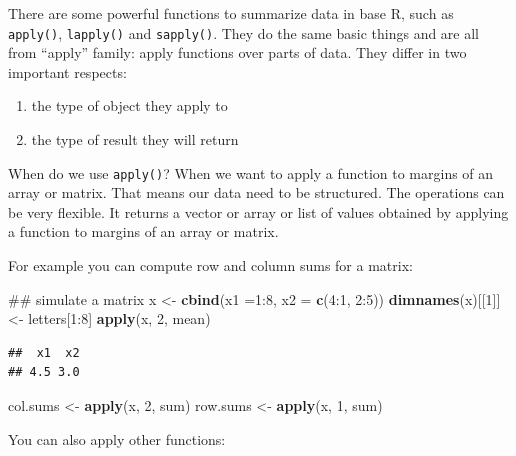 \documentclass[12pt,]{krantz}
\newenvironment{Shaded}{\begin{snugshade}}{\end{snugshade}}
\newcommand{\KeywordTok}[1]{\textcolor[rgb]{0.13,0.29,0.53}{\textbf{{#1}}}}
\newcommand{\DataTypeTok}[1]{\textcolor[rgb]{0.13,0.29,0.53}{{#1}}}
\newcommand{\DecValTok}[1]{\textcolor[rgb]{0.00,0.00,0.81}{{#1}}}
\newcommand{\StringTok}[1]{\textcolor[rgb]{0.31,0.60,0.02}{{#1}}}
\newcommand{\NormalTok}[1]{{#1}}
\providecommand{\tightlist}{%
  \setlength{\itemsep}{0pt}\setlength{\parskip}{0pt}}
\theoremstyle{definition}
\theoremstyle{definition}
\theoremstyle{remark}
\begin{document}
There are some powerful functions to summarize data in base R, such as
\texttt{apply()}, \texttt{lapply()} and \texttt{sapply()}. They do the
same basic things and are all from ``apply'' family: apply functions
over parts of data. They differ in two important respects:

\begin{enumerate}
\def\labelenumi{\arabic{enumi}.}
\tightlist
\item
  the type of object they apply to
\item
  the type of result they will return
\end{enumerate}

When do we use \texttt{apply()}? When we want to apply a function to
margins of an array or matrix. That means our data need to be
structured. The operations can be very flexible. It returns a vector or
array or list of values obtained by applying a function to margins of an
array or matrix.

For example you can compute row and column sums for a matrix:

\begin{Shaded}
\begin{Highlighting}[]
\NormalTok{## simulate a matrix}
\NormalTok{x <-}\StringTok{ }\KeywordTok{cbind}\NormalTok{(}\DataTypeTok{x1 =}\DecValTok{1}\NormalTok{:}\DecValTok{8}\NormalTok{, }\DataTypeTok{x2 =} \KeywordTok{c}\NormalTok{(}\DecValTok{4}\NormalTok{:}\DecValTok{1}\NormalTok{, }\DecValTok{2}\NormalTok{:}\DecValTok{5}\NormalTok{))}
\KeywordTok{dimnames}\NormalTok{(x)[[}\DecValTok{1}\NormalTok{]] <-}\StringTok{ }\NormalTok{letters[}\DecValTok{1}\NormalTok{:}\DecValTok{8}\NormalTok{]}
\KeywordTok{apply}\NormalTok{(x, }\DecValTok{2}\NormalTok{, mean)}
\end{Highlighting}
\end{Shaded}

\begin{verbatim}
##  x1  x2 
## 4.5 3.0
\end{verbatim}

\begin{Shaded}
\begin{Highlighting}[]
\NormalTok{col.sums <-}\StringTok{ }\KeywordTok{apply}\NormalTok{(x, }\DecValTok{2}\NormalTok{, sum)}
\NormalTok{row.sums <-}\StringTok{ }\KeywordTok{apply}\NormalTok{(x, }\DecValTok{1}\NormalTok{, sum)}
\end{Highlighting}
\end{Shaded}

You can also apply other functions:
\end{document}
